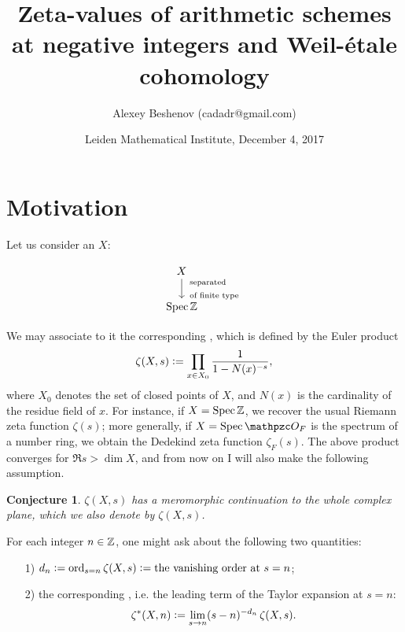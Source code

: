 \documentclass{article}
\date{Leiden Mathematical Institute, December 4, 2017}
\author{Alexey Beshenov (cadadr@gmail.com)}
\title{Zeta-values of arithmetic schemes at negative integers and Weil-étale cohomology}
\theoremstyle{plain}
\newtheorem*{conjecture*}{Conjecture}
\begin{document}
{\normalfont\sffamily\bfseries \maketitle}

\setcounter{section}{-1}
\section{Motivation}

Let us consider an  $X$:

\[ \begin{tikzcd}
    X \ar{d}{\begin{array}{l}\text{separated}\\\text{of finite type}\end{array}} \\
    \Spec \ZZ
\end{tikzcd} \]

We may associate to it the corresponding , which is defined
by the Euler product
$$\zeta (X, s) \mathrel{\mathop:}= \prod_{x\in X_0} \frac{1}{1 - N (x)^{-s}},$$
where $X_0$ denotes the set of closed points of $X$, and $N (x)$ is the
cardinality of the residue field of $x$. For instance, if $X = \operatorname{Spec} \mathbb{Z}$,
we recover the usual Riemann zeta function $\zeta (s)$; more generally, if
$X = \Spec \O_F$ is the spectrum of a number ring, we obtain the Dedekind zeta
function $\zeta_F (s)$. The above product converges for $\Re s > \dim X$, and
from now on I will also make the following assumption.

\begin{conjecture*}
  $\zeta (X,s)$ has a meromorphic continuation to the whole complex plane, which
  we also denote by $\zeta (X,s)$.
\end{conjecture*}

For each integer $n\in \mathbb{Z}$, one might ask about the following two quantities:

\begin{enumerate}
\item[1)]
  $d_n \mathrel{\mathop:}= \operatorname{ord}_{s = n} \zeta (X,s) \mathrel{\mathop:}= \text{the vanishing order at }s=n$;

\item[2)] the corresponding , i.e. the leading term of the
  Taylor expansion at $s = n$:
  $$\zeta^* (X,n) \mathrel{\mathop:}= \lim_{s\to n} (s-n)^{-d_n} \, \zeta (X,s).$$
\end{enumerate}
\end{document}
